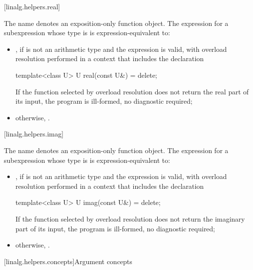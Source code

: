 [linalg.helpers.real]{}

\pnum
The name  denotes an exposition-only function object.
The expression  for a subexpression 
whose type is  is expression-equivalent to:
\begin{itemize}
\item
{},
if  is not an arithmetic type and
the expression  is valid,
with overload resolution performed in a context that includes the declaration
\begin{codeblock}
template<class U> U real(const U&) = delete;
\end{codeblock}
If the function selected by overload resolution
does not return the real part of its input,
the program is ill-formed, no diagnostic required;
\item
otherwise, .
\end{itemize}

[linalg.helpers.imag]{}

\pnum
The name  denotes an exposition-only function object.
The expression  for a subexpression 
whose type is  is expression-equivalent to:
\begin{itemize}
\item
{},
if  is not an arithmetic type and the expression 
is valid, with overload resolution performed in a context
that includes the declaration
\begin{codeblock}
template<class U> U imag(const U&) = delete;
\end{codeblock}
If the function selected by overload resolution
does not return the imaginary part of its input,
the program is ill-formed, no diagnostic required;
\item
otherwise, .
\end{itemize}

[linalg.helpers.concepts]{Argument concepts}

